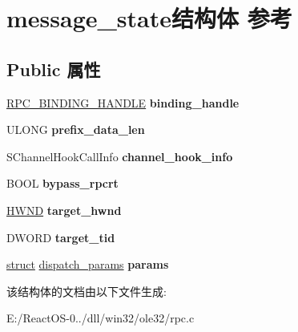 \hypertarget{structmessage__state}{}\section{message\+\_\+state结构体 参考}
\label{structmessage__state}
\subsection*{Public 属性}
\begin{DoxyCompactItemize}
\item 
\mbox{\label{structmessage__state_a8733d2e0f834bec79b169df41a370fa3}} 
\hyperlink{interfacevoid}{R\+P\+C\+\_\+\+B\+I\+N\+D\+I\+N\+G\+\_\+\+H\+A\+N\+D\+LE} {\bfseries binding\+\_\+handle}
\item 
\mbox{\label{structmessage__state_a3b7e2ddf3ee9a07e1dcaa4ba2c4af5ec}} 
U\+L\+O\+NG {\bfseries prefix\+\_\+data\+\_\+len}
\item 
\mbox{\label{structmessage__state_a0a3be95a3a5e8da8eea0c50e9eff6a95}} 
S\+Channel\+Hook\+Call\+Info {\bfseries channel\+\_\+hook\+\_\+info}
\item 
\mbox{\label{structmessage__state_a6e0cb86e22dfd9942a17f8cfecbbbe2c}} 
B\+O\+OL {\bfseries bypass\+\_\+rpcrt}
\item 
\mbox{\label{structmessage__state_a060775a8f35dab733fb71e27f1bd7506}} 
\hyperlink{interfacevoid}{H\+W\+ND} {\bfseries target\+\_\+hwnd}
\item 
\mbox{\label{structmessage__state_ac0e739b86e778cf4426c1f60e1f6746f}} 
D\+W\+O\+RD {\bfseries target\+\_\+tid}
\item 
\mbox{\label{structmessage__state_a0f5db7983ff7a926f3228a264d93f5a9}} 
\hyperlink{interfacestruct}{struct} \hyperlink{structdispatch__params}{dispatch\+\_\+params} {\bfseries params}
\end{DoxyCompactItemize}


该结构体的文档由以下文件生成\+:\begin{DoxyCompactItemize}
\item 
E\+:/\+React\+O\+S-\/0../dll/win32/ole32/rpc.\+c\end{DoxyCompactItemize}

